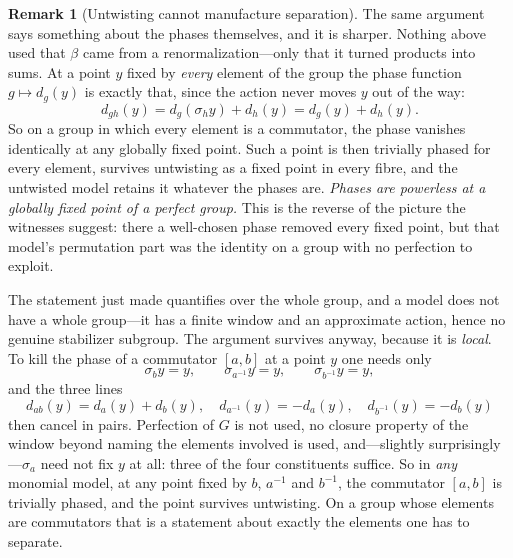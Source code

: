 \documentclass[11pt]{amsart}
\theoremstyle{definition}
\newtheorem{remark}[theorem]{Remark}
\theoremstyle{plain}
\begin{document}
\begin{remark}[Untwisting cannot manufacture separation]
The same argument says something about the phases themselves, and it is sharper.  Nothing above used that \(\beta\) came from a renormalization---only that it turned products into sums.  At a point \(y\) fixed by \emph{every} element of the group the phase function \(g\mapsto d_g(y)\) is exactly that, since the action never moves \(y\) out of the way:
\[
 d_{gh}(y)=d_g(\sigma_h y)+d_h(y)=d_g(y)+d_h(y).
\]
So on a group in which every element is a commutator, the phase vanishes identically at any globally fixed point.  Such a point is then trivially phased for every element, survives untwisting as a fixed point in every fibre, and the untwisted model retains it whatever the phases are.  \emph{Phases are powerless at a globally fixed point of a perfect group.}  This is the reverse of the picture the witnesses suggest: there a well-chosen phase removed every fixed point, but that model's permutation part was the identity on a group with no perfection to exploit.

The statement just made quantifies over the whole group, and a model does not have a whole group---it has a finite window and an approximate action, hence no genuine stabilizer subgroup.  The argument survives anyway, because it is \emph{local}.  To kill the phase of a commutator \([a,b]\) at a point \(y\) one needs only
\[
 \sigma_b y=y,\qquad \sigma_{a^{-1}}y=y,\qquad \sigma_{b^{-1}}y=y,
\]
and the three lines
\[
 d_{ab}(y)=d_a(y)+d_b(y),\quad d_{a^{-1}}(y)=-d_a(y),\quad d_{b^{-1}}(y)=-d_b(y)
\]
then cancel in pairs.  Perfection of \(G\) is not used, no closure property of the window beyond naming the elements involved is used, and---slightly surprisingly---\(\sigma_a\) need not fix \(y\) at all: three of the four constituents suffice.  So in \emph{any} monomial model, at any point fixed by \(b\), \(a^{-1}\) and \(b^{-1}\), the commutator \([a,b]\) is trivially phased, and the point survives untwisting.  On a group whose elements are commutators that is a statement about exactly the elements one has to separate.


\end{remark}
\end{document}
